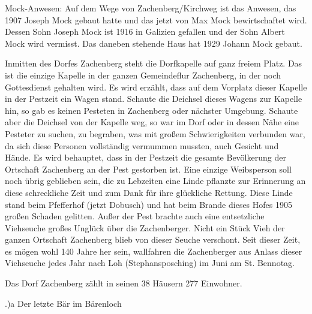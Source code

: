 Mock-Anwesen: Auf dem Wege von Zachenberg/Kirchweg ist das Anwesen, das 1907
Joseph Mock gebaut hatte und das jetzt von Max Mock bewirtschaftet wird. Dessen
Sohn Joseph Mock ist 1916 in Galizien gefallen und der Sohn Albert Mock wird
vermisst. Das daneben stehende Haus hat 1929 Johann Mock gebaut.

Inmitten des Dorfes Zachenberg steht die Dorfkapelle auf ganz freiem Platz. Das
ist die einzige Kapelle in der ganzen Gemeindeflur Zachenberg, in der noch
Gottesdienst gehalten wird. Es wird erzählt, dass auf dem Vorplatz dieser
Kapelle in der Pestzeit ein Wagen stand. Schaute die Deichsel dieses Wagens zur
Kapelle hin, so gab es keinen Pesteten in Zachenberg oder nächster Umgebung.
Schaute aber die Deichsel von der Kapelle weg, so war im Dorf oder in dessen
Nähe eine Pesteter zu suchen, zu begraben, was mit großem Schwierigkeiten
verbunden war, da sich diese Personen vollständig vermummen mussten, auch
Gesicht und Hände. Es wird behauptet, dass in der Pestzeit die gesamte
Bevölkerung der Ortschaft Zachenberg an der Pest gestorben ist. Eine einzige
Weibsperson soll noch übrig geblieben sein, die zu Lebzeiten eine Linde pflanzte
zur Erinnerung an diese schreckliche Zeit und zum Dank für ihre glückliche
Rettung. Diese Linde stand beim Pfefferhof (jetzt Dobusch) und hat beim Brande
dieses Hofes 1905 großen Schaden gelitten. Außer der Pest brachte auch eine
entsetzliche Viehseuche großes Unglück über die Zachenberger. Nicht ein Stück
Vieh der ganzen Ortschaft Zachenberg blieb von dieser Seuche verschont. Seit
dieser Zeit, es mögen wohl 140 Jahre her sein, wallfahren die Zachenberger aus
Anlass dieser Viehseuche jedes Jahr nach Loh (Stephansposching) im Juni am St.
Bennotag.

Das Dorf Zachenberg zählt in seinen 38 Häusern 277 Einwohner.

.)a Der letzte Bär im Bärenloch

